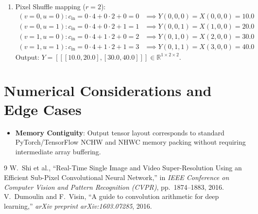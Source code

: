 \documentclass[11pt,a4paper]{article}
\theoremstyle{definition}
\begin{document}
\begin{enumerate}
    \item Pixel Shuffle mapping ($r = 2$):
    \begin{align}
    (v=0, u=0): c_{\text{in}} = 0 \cdot 4 + 0 \cdot 2 + 0 = 0 &\implies Y(0, 0, 0) = X(0, 0, 0) = 10.0 \\
    (v=0, u=1): c_{\text{in}} = 0 \cdot 4 + 0 \cdot 2 + 1 = 1 &\implies Y(0, 0, 1) = X(1, 0, 0) = 20.0 \\
    (v=1, u=0): c_{\text{in}} = 0 \cdot 4 + 1 \cdot 2 + 0 = 2 &\implies Y(0, 1, 0) = X(2, 0, 0) = 30.0 \\
    (v=1, u=1): c_{\text{in}} = 0 \cdot 4 + 1 \cdot 2 + 1 = 3 &\implies Y(0, 1, 1) = X(3, 0, 0) = 40.0
    \end{align}
    Output: $Y = [[[10.0, 20.0], [30.0, 40.0]]] \in \mathbb{R}^{1 \times 2 \times 2}$.
\end{enumerate}

\section{Numerical Considerations and Edge Cases}

\begin{itemize}
    \item \textbf{Memory Contiguity}: Output tensor layout corresponds to standard PyTorch/TensorFlow NCHW and NHWC memory packing without requiring intermediate array buffering.
\end{itemize}

\begin{thebibliography}{9}
 W.~Shi et al., ``Real-Time Single Image and Video Super-Resolution Using an Efficient Sub-Pixel Convolutional Neural Network,'' in \emph{IEEE Conference on Computer Vision and Pattern Recognition (CVPR)}, pp.~1874--1883, 2016.
 V.~Dumoulin and F.~Visin, ``A guide to convolution arithmetic for deep learning,'' \emph{arXiv preprint arXiv:1603.07285}, 2016.
\end{thebibliography}
\end{document}
